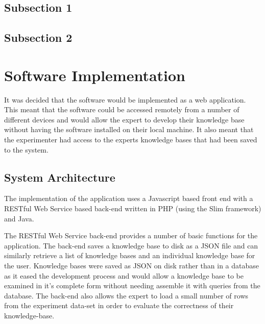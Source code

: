 \subsection{Subsection 1}




\subsection{Subsection 2}


\section{Software Implementation}

It was decided that the software would be implemented as a web application. This meant that the software could be accessed remotely from a number of different devices and would allow the expert to develop their knowledge base without having the software installed on their local machine. It also meant that the experimenter had access to the experts knowledge bases that had been saved to the system.

\subsection{System Architecture}

The implementation of the application uses a Javascript based front end with a RESTful Web Service based back-end written in PHP (using the Slim framework) and Java. 

The RESTful Web Service back-end provides a number of basic functions for the application. The back-end saves a knowledge base to disk as a JSON file and can similarly retrieve a list of knowledge bases and an individual knowledge base for the user. Knowledge bases were saved as JSON on disk rather than in a database as it eased the development process and would allow a knowledge base to be examined in it's complete form without needing assemble it with queries from the database. The back-end also allows the expert to load a small number of rows from the experiment data-set in order to evaluate the correctness of their knowledge-base.


